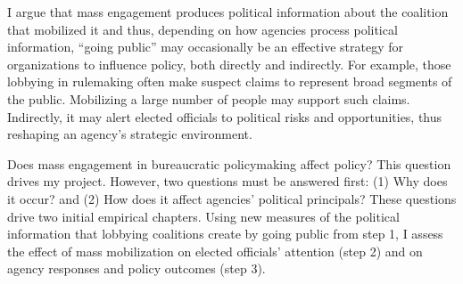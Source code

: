 I argue that mass engagement produces political information about the coalition that mobilized it and thus, depending on how agencies process political information, ``going public'' may occasionally be an effective strategy for organizations to influence policy, both directly and indirectly.
For example, those lobbying in rulemaking often make suspect claims to represent broad segments of the public. Mobilizing a large number of people may support such claims.
Indirectly, it may alert elected officials to political risks and opportunities, thus reshaping an agency's strategic environment.

Does mass engagement in bureaucratic policymaking affect policy? This question drives my project. However, two questions must be answered first: (1) Why does it occur? and (2) How does it affect agencies' political principals? These questions drive two initial empirical chapters.
Using new measures of the political information that lobbying coalitions create by going public from step 1, I assess the effect of mass mobilization on elected officials' attention (step 2) and on agency responses and policy outcomes (step 3).%

